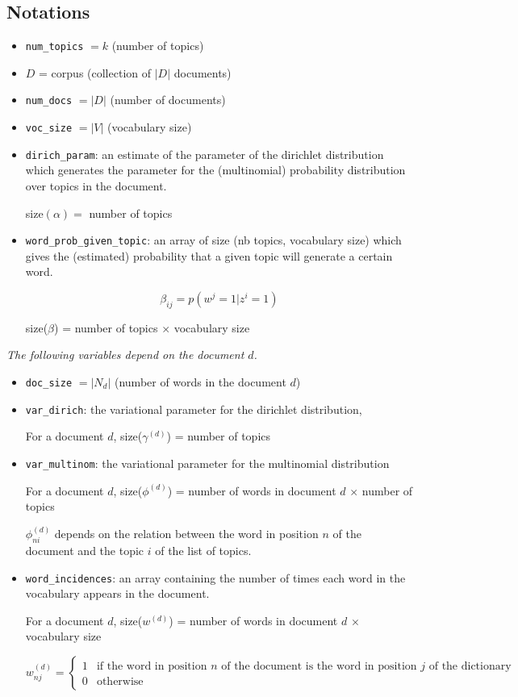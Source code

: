 \documentclass[10pt]{article}
\begin{document}
\subsection*{Notations}
\begin{itemize}
  \item \verb"num_topics" $=k$ (number of topics)
  \item $D$ = corpus (collection of $|D|$ documents)
  \item \verb"num_docs" $=|D|$ (number of documents)
  \item \verb"voc_size" $=|V|$ (vocabulary size)
  \item \verb"dirich_param": an estimate of the parameter of the dirichlet distribution
        which generates the parameter for the (multinomial) probability
        distribution over topics in the document.
        
        size$(\alpha) = $ number of topics
        
  \item \verb"word_prob_given_topic": an array of size (nb topics, vocabulary size) which
        gives the (estimated) probability that a given topic will generate a
        certain word.
        
        \[ \beta_{ij}= p(w^j = 1 | z^i = 1) \]
        
        size($\beta$) = number of topics $\times$ vocabulary size
 \end{itemize}

\bigskip

\emph{The following variables depend on the document $d$.}
 \begin{itemize}
  \item \verb"doc_size" $=|N_d|$ (number of words in the document $d$)
  \item \verb"var_dirich": the variational parameter for the dirichlet distribution,
 
  For a document $d$, size($\gamma^{(d)}$) = number of topics
  \item \verb"var_multinom": the variational parameter for the multinomial distribution
  
  For a document $d$, size($\phi^{(d)}$) = number of words in document $d$ $\times$ number of topics
  
  $\phi_{ni}^{(d)}$ depends on the relation between the word in position $n$ of the document and the topic $i$ of the list of topics.
   
  \item \verb"word_incidences": an array containing the number of times each word in the
    vocabulary appears in the document.
    
    For a document $d$,  size($w^{(d)}$) = number of words in document $d$ $\times$ vocabulary size 
    
    $w_{nj}^{(d)} = \begin{cases} 1 & \text{if the word in position } n \text{ of the document is the word in position } j \text{ of the dictionary} \\ 0 & \text{otherwise} \end{cases}$
\end{itemize}
\end{document}
